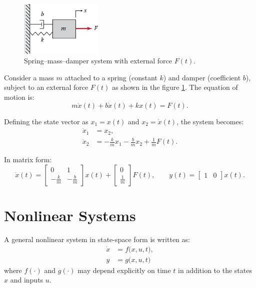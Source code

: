 \begin{example}

\begin{figure}[h!]
    \centering
    \includegraphics[width=0.35\textwidth]{Images/nonlinear/introduction/mass_spring_damper.jpg}
    \caption{Spring–mass–damper system with external force $F(t)$.}
    \label{fig:spring}
\end{figure}

Consider a mass $m$ attached to a spring (constant $k$) and damper (coefficient $b$), subject to an external force $F(t)$ as shown in the figure \ref{fig:spring}.  
The equation of motion is:
\begin{equation}
    m\ddot{x}(t) + b\dot{x}(t) + kx(t) = F(t).
\end{equation}

Defining the state vector as $x_1 = x(t)$ and $x_2 = \dot{x}(t)$, the system becomes:
\begin{align}
    \dot{x}_1 &= x_2, \\
    \dot{x}_2 &= -\tfrac{k}{m}x_1 - \tfrac{b}{m}x_2 + \tfrac{1}{m}F(t).
\end{align}

In matrix form:
\begin{equation}
\dot{x}(t) =
\begin{bmatrix}
0 & 1 \\
-\tfrac{k}{m} & -\tfrac{b}{m}
\end{bmatrix} x(t) +
\begin{bmatrix}
0 \\ \tfrac{1}{m}
\end{bmatrix} F(t),
\qquad
y(t) =
\begin{bmatrix}
1 & 0
\end{bmatrix} x(t).
\end{equation}
\end{example}

\section{Nonlinear Systems}
\begin{definition}
A general nonlinear system in state-space form is written as:
\begin{align}
    \dot{x} &= f\big(x,u,t\big), \\
    y &= g\big(x,u,t\big)
\end{align}
where $f(\cdot)$ and $g(\cdot)$ may depend explicitly on time $t$ in addition to the states $x$ and inputs $u$.
\end{definition}

